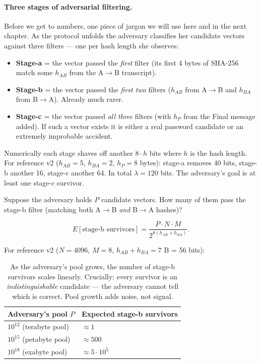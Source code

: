 \documentclass[11pt,a4paper]{article}
\begin{document}
\paragraph{Three stages of adversarial filtering.} Before we get to numbers, one piece of jargon we will use here and in the next chapter. As the protocol unfolds the adversary classifies her candidate vectors against three filters --- one per hash length she observes:
\begin{itemize}[leftmargin=*]
\item \textbf{Stage-a} = the vector passed the \emph{first} filter (its first 4 bytes of SHA-256 match some $h_{AB}$ from the A$\to$B transcript).
\item \textbf{Stage-b} = the vector passed the \emph{first two} filters ($h_{AB}$ from A$\to$B and $h_{BA}$ from B$\to$A). Already much rarer.
\item \textbf{Stage-c} = the vector passed \emph{all three} filters (with $h_P$ from the Final message added). If such a vector exists it is either a real password candidate or an extremely improbable accident.
\end{itemize}
Numerically each stage shaves off another $8 \cdot h$ bits where $h$ is the hash length. For reference v2 ($h_{AB}=5$, $h_{BA}=2$, $h_P=8$ bytes): stage-a removes 40 bits, stage-b another 16, stage-c another 64. In total $\lambda = 120$ bits. The adversary's goal is at least one stage-c survivor.

\medskip
Suppose the adversary holds $P$ candidate vectors. How many of them pass the stage-b filter (matching both A$\to$B \emph{and} B$\to$A hashes)?

\[
E[\text{stage-b survivors}] = \frac{P \cdot N \cdot M}{2^{8(h_{AB} + h_{BA})}}.
\]

For reference v2 ($N = 4096$, $M = 8$, $h_{AB} + h_{BA} = 7$ B = 56 bits):

\begin{table}[ht]
\centering
\small
\begin{tabular}{ll}
\toprule
Adversary's pool $P$ & Expected stage-b survivors \\
\midrule
$10^{12}$ (terabyte pool) & $\approx 1$ \\
$10^{15}$ (petabyte pool) & $\approx 500$ \\
$10^{18}$ (exabyte pool) & $\approx 5 \cdot 10^{5}$ \\
\bottomrule
\end{tabular}
\caption{As the adversary's pool grows, the number of stage-b survivors scales linearly. Crucially: every survivor is an \emph{indistinguishable} candidate --- the adversary cannot tell which is correct. Pool growth adds noise, not signal.}
\label{tab:pop-flooding}
\end{table}
\end{document}
